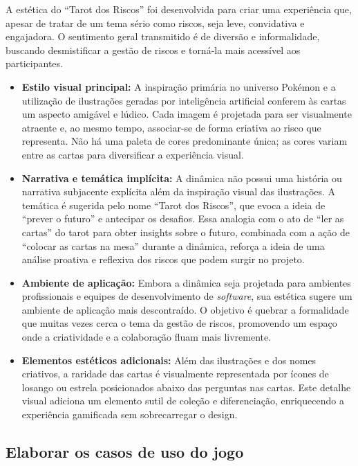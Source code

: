 \documentclass[
	12pt,
	openright,
	twoside,
	a4paper,
	english,
	brazil
	]{abntex2}
\begin{document}
A estética do “Tarot dos Riscos” foi desenvolvida para criar uma experiência que, apesar de tratar de um tema sério como riscos, seja leve, convidativa e engajadora. O sentimento geral transmitido é de diversão e informalidade, buscando desmistificar a gestão de riscos e torná-la mais acessível aos participantes.

\begin{itemize}
\item \textbf{Estilo visual principal:} A inspiração primária no universo Pokémon e a utilização de ilustrações geradas por inteligência artificial conferem às cartas um aspecto amigável e lúdico. Cada imagem é projetada para ser visualmente atraente e, ao mesmo tempo, associar-se de forma criativa ao risco que representa. Não há uma paleta de cores predominante única; as cores variam entre as cartas para diversificar a experiência visual. 
\item \textbf{Narrativa e temática implícita:} A dinâmica não possui uma história ou narrativa subjacente explícita além da inspiração visual das ilustrações. A temática é sugerida pelo nome “Tarot dos Riscos”, que evoca a ideia de “prever o futuro” e antecipar os desafios. Essa analogia com o ato de “ler as cartas” do tarot para obter insights sobre o futuro, combinada com a ação de “colocar as cartas na mesa” durante a dinâmica, reforça a ideia de uma análise proativa e reflexiva dos riscos que podem surgir no projeto. 
\item \textbf{Ambiente de aplicação:} Embora a dinâmica seja projetada para ambientes profissionais e equipes de desenvolvimento de \textit{software}, sua estética sugere um ambiente de aplicação mais descontraído. O objetivo é quebrar a formalidade que muitas vezes cerca o tema da gestão de riscos, promovendo um espaço onde a criatividade e a colaboração fluam mais livremente. 
\item \textbf{Elementos estéticos adicionais:} Além das ilustrações e dos nomes criativos, a raridade das cartas é visualmente representada por ícones de losango ou estrela posicionados abaixo das perguntas nas cartas. Este detalhe visual adiciona um elemento sutil de coleção e diferenciação, enriquecendo a experiência gamificada sem sobrecarregar o design. 
\end{itemize}

\subsection{Elaborar os casos de uso do jogo}
\label{sec:casos-de-uso}
\end{document}

